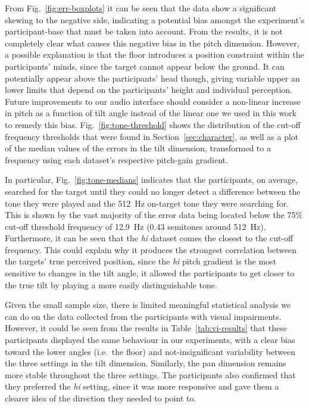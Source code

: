\documentclass[sigconf, review=true, screen=true, anonymous=true]{acmart}
\begin{document}
From Fig.~\ref{fig:err-boxplots} it can be seen that the data show a significant skewing to the negative side, indicating a potential bias amongst the experiment's participant-base that must be taken into account. From the results, it is not completely clear what causes this negative bias in the pitch dimension. However, a possible explanation is that the floor introduces a position constraint within the participants' minds, since the target cannot appear below the ground. It can potentially appear above the participants' head though, giving variable upper an lower limits that depend on the participants' height and individual perception. Future improvements to our audio interface should consider a non-linear increase in pitch as a function of tilt angle instead of the linear one we used in this work to remedy this bias. Fig.~\ref{fig:tone-threshold} shows the distribution of the cut-off frequency thresholds that were found in Section~\ref{sec:character}, as well as a plot of the median values of the errors in the tilt dimension, transformed to a frequency using each dataset's respective pitch-gain gradient. 

In particular, Fig.~\ref{fig:tone-medians} indicates that the participants, on average, searched for the target until they could no longer detect a difference between the tone they were played and the \SI{512}{\hertz} on-target tone they were searching for. This is shown by the vast majority of the error data being located below the 75\% cut-off threshold frequency of \SI{12.9}{\hertz} (0.43 semitones around \SI{512}{\hertz}). Furthermore, it can be seen that the \emph{hi} dataset comes the closest to the cut-off frequency. This could explain why it produces the strongest correlation between the targets' true perceived position, since the \emph{hi} pitch gradient is the most sensitive to changes in the tilt angle, it allowed the participants to get closer to the true tilt by playing a more easily distinguishable tone.

Given the small sample size, there is limited meaningful statistical analysis we can do on the data collected from the participants with visual impairments. However, it could be seen from the results in Table~\ref{tab:vi-results} that these participants displayed the same behaviour in our experiments, with a clear bias toward the lower angles (i.e.\ the floor) and not-insignificant variability between the three settings in the tilt dimension. Similarly, the pan dimension remains more stable throughout the three settings. The participants also confirmed that they preferred the \emph{hi} setting, since it was more responsive and gave them a clearer idea of the direction they needed to point to. 
\end{document}
